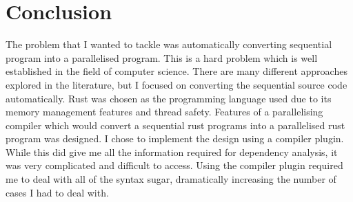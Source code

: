 \chapter{Conclusion}
The problem that I wanted to tackle was automatically converting sequential program into a parallelised program. This is a hard problem which is well established in the field of computer science. There are many different approaches explored in the literature, but I focused on converting the sequential source code automatically. Rust was chosen as the programming language used due to its memory management features and thread safety. Features of a parallelising compiler which would convert a sequential rust programs into a parallelised rust program was designed.  I chose to implement the design using a compiler plugin. While this did give me all the information required for dependency analysis, it was very complicated and difficult to access. Using the compiler plugin required me to deal with all of the syntax sugar, dramatically increasing the number of cases I had to deal with. 

